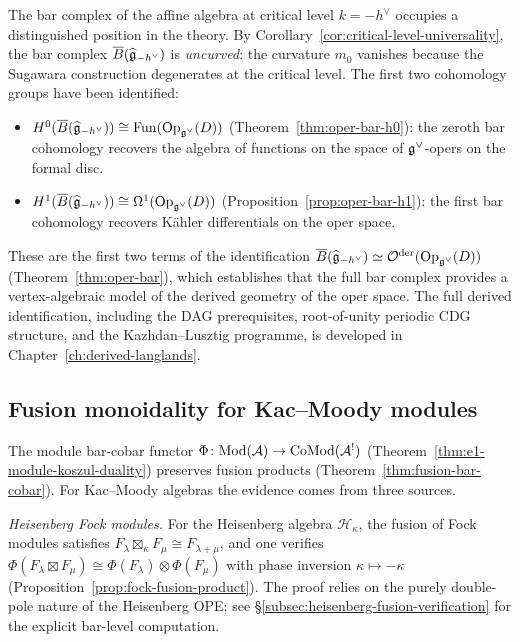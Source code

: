 The bar complex of the affine algebra at critical level
$k = -h^\vee$ occupies a distinguished position in the theory.
By Corollary~\ref{cor:critical-level-universality}, the bar
complex $\overline{B}(\widehat{\mathfrak{g}}_{-h^\vee})$ is \emph{uncurved}:
the curvature $m_0$ vanishes because the Sugawara construction
degenerates at the critical level.  The first two cohomology
groups have been identified:

\begin{itemize}
\item $H^0(\overline{B}(\widehat{\mathfrak{g}}_{-h^\vee}))
  \cong \mathrm{Fun}(\mathrm{Op}_{\mathfrak{g}^\vee}(D))$
  (Theorem~\ref{thm:oper-bar-h0}): the zeroth bar cohomology
  recovers the algebra of functions on the space of
  $\mathfrak{g}^\vee$-opers on the formal disc.
\item $H^1(\overline{B}(\widehat{\mathfrak{g}}_{-h^\vee}))
  \cong \Omega^1(\mathrm{Op}_{\mathfrak{g}^\vee}(D))$
  (Proposition~\ref{prop:oper-bar-h1}): the first bar cohomology
  recovers K\"ahler differentials on the oper space.
\end{itemize}

These are the first two terms of the identification
$\overline{B}(\widehat{\mathfrak{g}}_{-h^\vee})
\simeq \mathcal{O}^{\mathrm{der}}(\mathrm{Op}_{\mathfrak{g}^\vee}(D))$
(Theorem~\ref{thm:oper-bar}), which establishes that the full
bar complex provides a vertex-algebraic model of the derived
geometry of the oper space.  The full derived identification,
including the DAG prerequisites, root-of-unity periodic CDG
structure, and the Kazhdan--Lusztig programme, is developed in
Chapter~\ref{ch:derived-langlands}.

\subsection{Fusion monoidality for Kac--Moody modules}
\label{subsec:km-fusion-monoidality}

The module bar-cobar functor
$\Phi\colon \mathrm{Mod}(\mathcal{A}) \to \mathrm{CoMod}(\mathcal{A}^!)$
(Theorem~\ref{thm:e1-module-koszul-duality}) preserves
fusion products
(Theorem~\ref{thm:fusion-bar-cobar}).  For Kac--Moody
algebras the evidence comes from three sources.

\emph{Heisenberg Fock modules.}
For the Heisenberg algebra $\mathcal{H}_\kappa$, the fusion of
Fock modules satisfies
$F_\lambda \boxtimes_\kappa F_\mu \cong F_{\lambda+\mu}$,
and one verifies
$\Phi(F_\lambda \boxtimes F_\mu)
\cong \Phi(F_\lambda) \otimes \Phi(F_\mu)$
with phase inversion $\kappa \mapsto -\kappa$
(Proposition~\ref{prop:fock-fusion-product}).  The proof relies
on the purely double-pole nature of the Heisenberg OPE; see
\S\ref{subsec:heisenberg-fusion-verification} for the explicit
bar-level computation.

